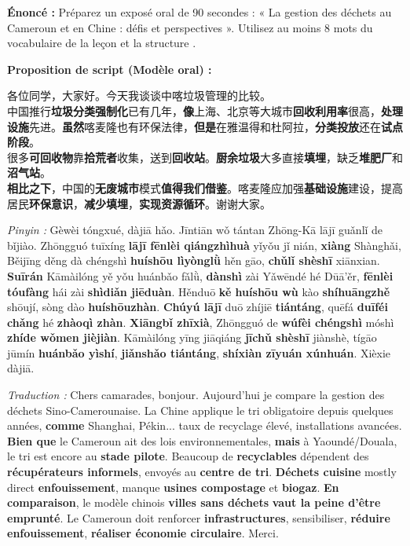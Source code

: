 \documentclass[11pt]{article}
\newcommand{\zh}[1]{\ifmmode\text{#1}\else{#1}\fi}
\begin{document}
\begin{exoresolu}
\textbf{Énoncé :} Préparez un exposé oral de 90 secondes : « La gestion des déchets au Cameroun et en Chine : défis et perspectives ». Utilisez au moins 8 mots du vocabulaire de la leçon et la structure \zh{虽然……，但是……}.

\tcblower

\textbf{Proposition de script (Modèle oral) :}

\begin{textebox}
各位同学，大家好。今天我谈谈中喀垃圾管理的比较。\\
中国推行\textbf{垃圾分类强制化}已有几年，\textbf{像}上海、北京等大城市\textbf{回收利用率}很高，\textbf{处理设施}先进。\textbf{虽然}喀麦隆也有环保法律，\textbf{但是}在雅温得和杜阿拉，\textbf{分类投放}还在\textbf{试点阶段}。\\
很多\textbf{可回收物}靠\textbf{拾荒者}收集，送到\textbf{回收站}。\textbf{厨余垃圾}大多直接\textbf{填埋}，缺乏\textbf{堆肥厂}和\textbf{沼气站}。\\
\textbf{相比之下}，中国的\textbf{无废城市}模式\textbf{值得我们借鉴}。喀麦隆应加强\textbf{基础设施}建设，提高居民\textbf{环保意识}，\textbf{减少填埋}，\textbf{实现资源循环}。谢谢大家。

\textit{Pinyin :}
Gèwèi tóngxué, dàjiā hǎo. Jīntiān wǒ tántan Zhōng-Kā lājī guǎnlǐ de bǐjiào.
Zhōngguó tuīxíng \textbf{lājī fēnlèi qiángzhìhuà} yǐyǒu jǐ nián, \textbf{xiàng} Shànghǎi, Běijīng děng dà chéngshì \textbf{huíshōu lìyònglǜ} hěn gāo, \textbf{chǔlǐ shèshī} xiānxian. \textbf{Suīrán} Kāmàilóng yě yǒu huánbǎo fǎlǜ, \textbf{dànshì} zài Yǎwēndé hé Dūā'ěr, \textbf{fēnlèi tóufàng} hái zài \textbf{shìdiǎn jiēduàn}.
Hěnduō \textbf{kě huíshōu wù} kào \textbf{shíhuāngzhě} shōují, sòng dào \textbf{huíshōuzhàn}. \textbf{Chúyú lājī} duō zhíjiē \textbf{tiántáng}, quēfá \textbf{duīféi chǎng} hé \textbf{zhàoqì zhàn}.
\textbf{Xiāngbǐ zhīxià}, Zhōngguó de \textbf{wúfèi chéngshì} móshì \textbf{zhíde wǒmen jièjiàn}. Kāmàilóng yīng jiāqiáng \textbf{jīchǔ shèshī} jiànshè, tígāo jūmín \textbf{huánbǎo yìshí}, \textbf{jiǎnshǎo tiántáng}, \textbf{shíxiàn zīyuán xúnhuán}. Xièxie dàjiā.

\textit{Traduction :}
Chers camarades, bonjour. Aujourd'hui je compare la gestion des déchets Sino-Camerounaise.
La Chine applique le tri obligatoire depuis quelques années, \textbf{comme} Shanghai, Pékin... taux de recyclage élevé, installations avancées. \textbf{Bien que} le Cameroun ait des lois environnementales, \textbf{mais} à Yaoundé/Douala, le tri est encore au \textbf{stade pilote}.
Beaucoup de \textbf{recyclables} dépendent des \textbf{récupérateurs informels}, envoyés au \textbf{centre de tri}. \textbf{Déchets cuisine} mostly direct \textbf{enfouissement}, manque \textbf{usines compostage} et \textbf{biogaz}.
\textbf{En comparaison}, le modèle chinois \textbf{villes sans déchets} \textbf{vaut la peine d'être emprunté}. Le Cameroun doit renforcer \textbf{infrastructures}, sensibiliser, \textbf{réduire enfouissement}, \textbf{réaliser économie circulaire}. Merci.
\end{textebox}


\end{exoresolu}
\end{document}

